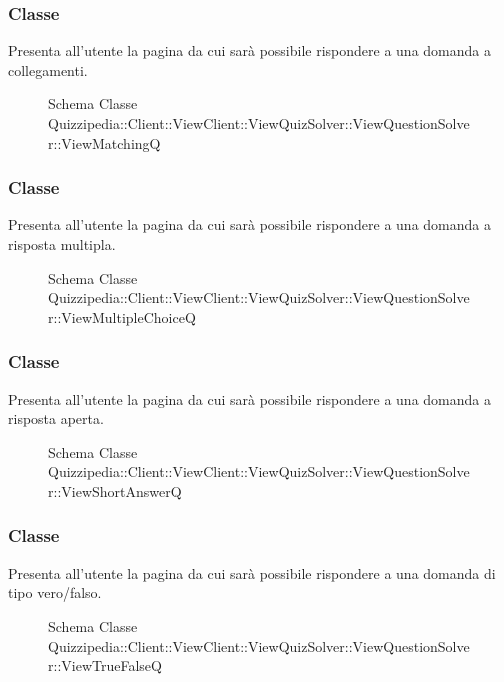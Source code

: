 \subsubsection{Classe }
Presenta all'utente la pagina da cui sarà possibile rispondere a una domanda a collegamenti.
\begin{figure}[H]
\centering
\noindent{}
\caption[Schema Classe ViewMatchingQ]{Schema Classe Quizzipedia::Client::ViewClient::ViewQuizSolver::ViewQuestionSolver::ViewMatchingQ}
\end{figure}
\subsubsection{Classe }
Presenta all'utente la pagina da cui sarà possibile rispondere a una domanda a risposta multipla.
\begin{figure}[H]
\centering
\noindent{}
\caption[Schema Classe ViewMultipleChoiceQ]{Schema Classe Quizzipedia::Client::ViewClient::ViewQuizSolver::ViewQuestionSolver::ViewMultipleChoiceQ}
\end{figure}
\subsubsection{Classe }
Presenta all'utente la pagina da cui sarà possibile rispondere a una domanda a risposta aperta.
\begin{figure}[H]
\centering
\noindent{}
\caption[Schema Classe ViewShortAnswerQ]{Schema Classe Quizzipedia::Client::ViewClient::ViewQuizSolver::ViewQuestionSolver::ViewShortAnswerQ}
\end{figure}
\subsubsection{Classe }
Presenta all'utente la pagina da cui sarà possibile rispondere a una domanda di tipo vero/falso.
\begin{figure}[H]
\centering
\noindent{}
\caption[Schema Classe ViewTrueFalseQ]{Schema Classe Quizzipedia::Client::ViewClient::ViewQuizSolver::ViewQuestionSolver::ViewTrueFalseQ}
\end{figure}
